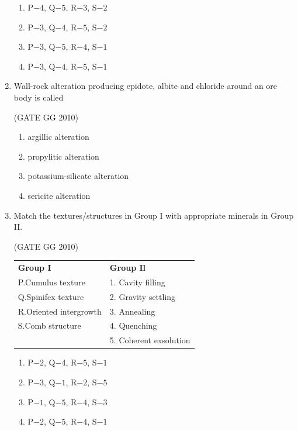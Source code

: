 \documentclass[journal]{IEEEtran}
\begin{document}
\begin{enumerate}
\begin{multicols}{2}
\begin{enumerate}
    \item P$- 4$, Q$- 5$, R$- 3$, S$- 2$
    \item P$- 3$, Q$- 4$, R$- 5$, S$- 2$
    \item P$- 3$, Q$- 5$, R$- 4$, S$- 1$
    \item P$- 3$, Q$- 4$, R$- 5$, S$- 1$
\end{enumerate}
\end{multicols}

\item Wall-rock alteration producing epidote, albite and chloride around an ore body is called 

\hfill (GATE GG 2010) 
\begin{multicols}{2}

\begin{enumerate}
    \item argillic alteration
    \item propylitic alteration
    \item potassium-silicate alteration
    \item sericite alteration
\end{enumerate}
\end{multicols}
\item Match the textures/structures  in Group I with appropriate minerals in Group II.

\hfill (GATE GG 2010) \\

\begin{tabular}{ l l }
\textbf{Group I} & \textbf{Group Il}\\

P.Cumulus texture & 1. Cavity filling\\
Q.Spinifex texture & 2. Gravity settling\\
R.Oriented intergrowth & 3. Annealing\\
S.Comb structure & 4. Quenching\\
& 5. Coherent exsolution \\
\end{tabular}
\begin{multicols}{2}
\begin{enumerate}
    \item  P$- 2$, Q$- 4$, R$- 5$, S$- 1$
     \item P$- 3$, Q$- 1$, R$- 2$, S$- 5$
      \item P$- 1$, Q$- 5$, R$- 4$, S$- 3$
       \item P$- 2$, Q$- 5$, R$- 4$, S$- 1$ 
\end{enumerate}


\end{multicols}
\end{enumerate}
\end{document}

